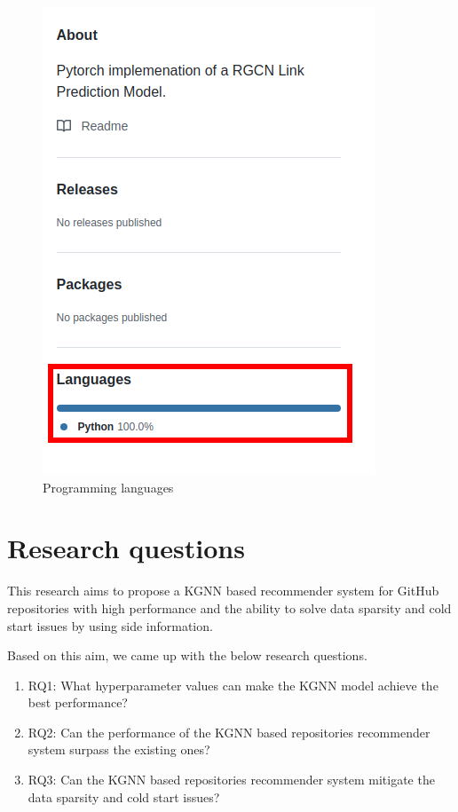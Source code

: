 \documentclass[11pt,twoside]{report}
\begin{document}
\begin{figure}[H]
    \centering
    \includegraphics[scale=0.4]{programming_languages.png}
    \caption{Programming languages}
    \label{fig:programming_languages}
\end{figure}

\section{Research questions}
This research aims to propose a KGNN based recommender system for GitHub repositories with high performance and the ability to solve data sparsity and cold start issues by using side information.

Based on this aim, we came up with the below research questions.

\begin{enumerate}
    \item RQ1: What hyperparameter values can make the KGNN model achieve the best performance?
    \item RQ2: Can the performance of the KGNN based repositories recommender system surpass the existing ones?
    \item RQ3: Can the KGNN based repositories recommender system mitigate the data sparsity and cold start issues?
\end{enumerate}
\end{document}
